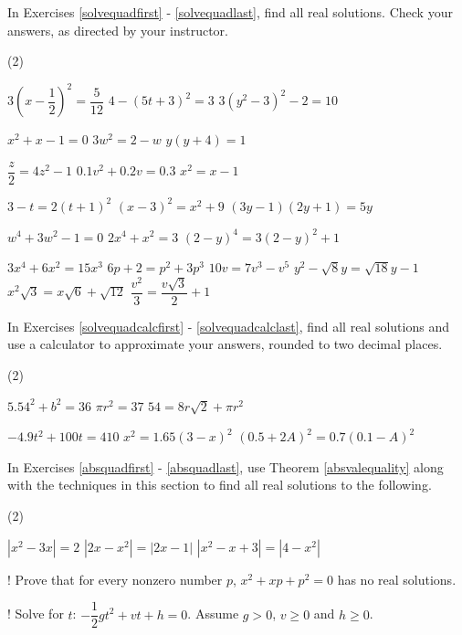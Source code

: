 \label{ExercisesforAppQuadEqus}

In Exercises \ref{solvequadfirst} - \ref{solvequadlast}, find all real solutions.  Check your answers, as directed by your instructor.

\begin{tasks}(2)

\task  $3\left(x - \dfrac{1}{2}\right)^2 = \dfrac{5}{12}$ \label{solvequadfirst}
\task  $4 - (5t+3)^2 = 3$ 
\task  $3(y^2-3)^2-2 = 10$ 

\task $x^2 + x - 1 = 0$
\task $3w^2 = 2-w$
\task $y(y+4) = 1$

\task $\dfrac{z}{2} = 4z^2-1$
\task  $0.1v^2 + 0.2v = 0.3$ 
\task $x^2 = x - 1$

\task $3-t = 2(t+1)^2$
\task $(x-3)^2 = x^2+9$
\task $(3y-1)(2y+1) = 5y$

\task $w^4 + 3w^2 - 1 = 0$
\task $2x^4 +x^2 = 3$ 
\task $(2-y)^4 = 3(2-y)^2 + 1$

\task $3x^4 + 6x^2 = 15x^3$
\task $6p + 2 = p^2 + 3p^3$
\task $10v = 7v^3 - v^5$
\task $y^2 - \sqrt{8} y = \sqrt{18} y - 1$
\task $x^2 \sqrt{3} = x \sqrt{6} + \sqrt{12}$
\task $\dfrac{v^2}{3} = \dfrac{v \sqrt{3}}{2} + 1$ \label{solvequadlast}

\end{tasks}

In Exercises \ref{solvequadcalcfirst} - \ref{solvequadcalclast}, find all real solutions and use a calculator to approximate your answers, rounded to two decimal places.

\begin{tasks}[resume](2)

\task $5.54^2 + b^2 = 36$\label{solvequadcalcfirst}
\task $\pi r^2 = 37$ 
\task $54 = 8r\sqrt{2} + \pi r^2$

\task $-4.9t^2 + 100t = 410$
\task $x^2 = 1.65(3-x)^2$
\task $(0.5+2A)^2 = 0.7(0.1-A)^2$ \label{solvequadcalclast}

\end{tasks}

In Exercises \ref{absquadfirst} - \ref{absquadlast}, use Theorem \ref{absvalequality} along with the techniques in this section to find all real solutions to the following.

\begin{tasks}[resume](2)

\task $|x^2 - 3x| = 2$ \label{absquadfirst}
\task $|2x-x^2| = |2x-1|$
\task $|x^2 -x + 3| = |4-x^2|$ \label{absquadlast}

\task!  Prove that for every nonzero number $p$, $x^2 + xp + p^2 = 0$  has no real solutions.

\task!  Solve for $t$: $-\dfrac{1}{2} g t^2 + vt + h = 0$. Assume $g > 0$, $v \geq 0$ and $h \geq 0$.

\end{tasks}

